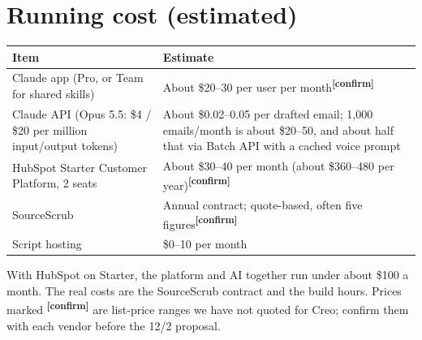 \documentclass[11pt]{article}
\newcommand{\verify}{\textcolor{orange!80!black}{\textsuperscript{\textbf{[confirm]}}}}
\begin{document}
\section{Running cost (estimated)}
\begin{center}
\renewcommand{\arraystretch}{1.2}\small
\begin{tabular}{L{6.6cm} L{6.4cm}}
\toprule
\textbf{Item} & \textbf{Estimate} \\
\midrule
Claude app (Pro, or Team for shared skills) & About \$20--30 per user per month\verify \\
Claude API (Opus 5.5: \$4 / \$20 per million input/output tokens) &
About \$0.02--0.05 per drafted email; 1{,}000 emails/month is about \$20--50, and about half
that via Batch API with a cached voice prompt \\
HubSpot Starter Customer Platform, 2 seats & About \$30--40 per month
(about \$360--480 per year)\verify \\
SourceScrub & Annual contract; quote-based, often five figures\verify \\
Script hosting & \$0--10 per month \\
\bottomrule
\end{tabular}
\end{center}
With HubSpot on Starter, the platform and AI together run under about \$100 a month. The real
costs are the SourceScrub contract and the build hours. Prices marked \verify{} are list-price ranges we have not
quoted for Creo; confirm them with each vendor before the 12/2 proposal.

\end{document}
